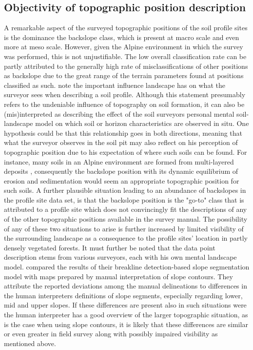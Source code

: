 \documentclass[final,1p,times,twocolumn,authoryear]{elsarticle}
\begin{document}
\subsection{Objectivity of topographic position description}
A remarkable aspect of the surveyed topographic positions of the soil profile sites is the dominance the backslope class, which is present at macro scale and even more at meso scale. However, given the Alpine environment in which the survey was performed, this is not unjustifiable. The low overall classification rate can be partly attributed to the generally high rate of misclassifications of other positions as backslope due to the great range of the terrain parameters found at positions classified as such. \cite{Brevik2015} note the important influence landscape has on what the surveyor sees when describing a soil profile. Although this statement presumably refers to the undeniable influence of topography on soil formation, it can also be (mis)interpreted as describing the effect of the soil surveyors personal mental soil-landscape model on which soil or horizon characteristics are observed in situ. One hypothesis could be that this relationship goes in both directions, meaning that what the surveyor observes in the soil pit may also reflect on his perception of topographic position due to his expectation of where such soils can be found. For instance, many soils in an Alpine environment are formed from multi-layered deposits \citep{Baruck2015,Geitner2011a}, consequently the backslope position with its dynamic equilibrium of erosion and sedimentation would seem an appropriate topographic position for such soils. A further plausible situation leading to an abundance of backslopes in the profile site data set, is that the backslope position is the "go-to" class that is attributed to a profile site which does not convincingly fit the descriptions of any of the other topographic positions available in the survey manual. The possibility of any of these two situations to arise is further increased by limited visibility of the surrounding landscape as a consequence to the profile sites' location in partly densely vegetated forests. It must further be noted that the data point description stems from various surveyors, each with his own mental landscape model. \cite{Matsuura2012} compared the results of their breakline detection-based slope segmentation model with maps prepared by manual interpretation of slope contours. They attribute the reported deviations among the manual delineations to differences in the human interpreters definitions of slope segments, especially regarding lower, mid and upper slopes. If these differences are present also in such situations were the human interpreter has a good overview of the larger topographic situation, as is the case when using slope contours, it is likely that these differences are similar or even greater in field survey along with possibly impaired visibility as mentioned above. 
\end{document}
